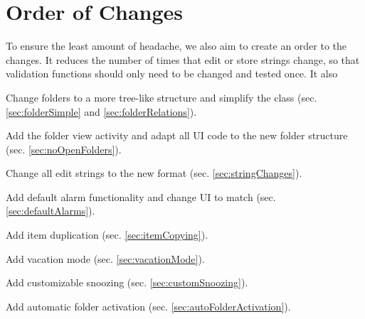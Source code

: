 \documentclass[11pt]{article} %
\begin{document}
\section{Order of Changes}
To ensure the least amount of headache, we also aim to create an order to the changes. It reduces the number of times that edit or store strings change, so that validation functions should only need to be changed and tested once. It also 

\begin{compactenum}
	\item Change folders to a more tree-like structure and simplify the class (sec. \ref{sec:folderSimple} and \ref{sec:folderRelations}).
	\item Add the folder view activity and adapt all UI code to the new folder structure (sec. \ref{sec:noOpenFolders}). 
	\item Change all edit strings to the new format (sec. \ref{sec:stringChanges}). 
	\item Add default alarm functionality and change UI to match (sec. \ref{sec:defaultAlarms}).
	\item Add item duplication (sec. \ref{sec:itemCopying}).
	\item Add vacation mode (sec. \ref{sec:vacationMode}). 
	\item Add customizable snoozing (sec. \ref{sec:customSnoozing}).
	\item Add automatic folder activation (sec. \ref{sec:autoFolderActivation}).
\end{compactenum}
\end{document}
